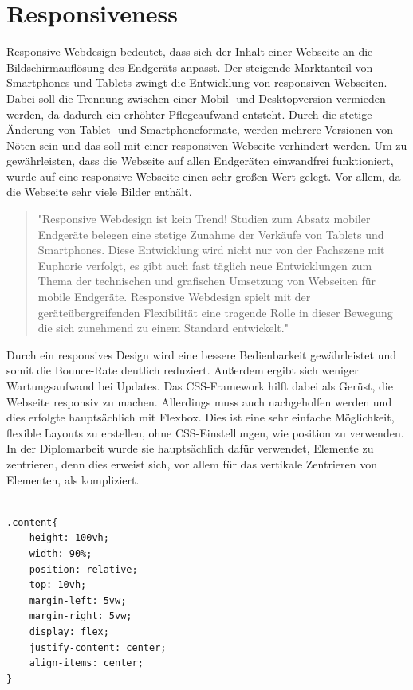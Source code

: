 \section{Responsiveness}
Responsive Webdesign bedeutet, dass sich der Inhalt einer Webseite an die Bildschirmauflösung des Endgeräts anpasst. Der steigende Marktanteil von Smartphones und Tablets zwingt die Entwicklung von responsiven Webseiten. Dabei soll die Trennung zwischen einer Mobil- und Desktopversion vermieden werden, da dadurch ein erhöhter Pflegeaufwand entsteht. Durch die stetige Änderung von Tablet- und Smartphoneformate, werden mehrere Versionen von Nöten sein und das soll mit einer responsiven Webseite verhindert werden.
Um zu gewährleisten, dass die Webseite auf allen Endgeräten einwandfrei funktioniert, wurde auf eine responsive Webseite einen sehr großen Wert gelegt. Vor allem, da die Webseite sehr viele Bilder enthält.
\begin{quote}
"Responsive Webdesign ist kein Trend! Studien zum Absatz mobiler Endgeräte belegen eine stetige Zunahme der Verkäufe von Tablets und Smartphones. Diese Entwicklung wird nicht nur von der Fachszene mit Euphorie verfolgt, es gibt auch fast täglich neue Entwicklungen zum Thema der technischen und grafischen Umsetzung von Webseiten für mobile Endgeräte. Responsive Webdesign spielt mit der geräteübergreifenden Flexibilität eine tragende Rolle in dieser Bewegung die sich zunehmend zu einem Standard entwickelt." \cite{responsive}
\end{quote}
Durch ein responsives Design wird eine bessere Bedienbarkeit gewährleistet und somit die Bounce-Rate deutlich reduziert. Außerdem ergibt sich weniger Wartungsaufwand bei Updates.  Das CSS-Framework hilft dabei als Gerüst, die Webseite responsiv zu machen. Allerdings muss auch nachgeholfen werden und dies erfolgte hauptsächlich mit Flexbox. Dies ist eine sehr einfache Möglichkeit, flexible Layouts zu erstellen, ohne CSS-Einstellungen, wie position zu verwenden. In der Diplomarbeit wurde sie hauptsächlich dafür verwendet, Elemente zu zentrieren, denn dies erweist sich, vor allem für das vertikale Zentrieren von Elementen, als kompliziert. \cite{responsive}
\lstset{
  frame=leftline,
  xleftmargin=.05\textwidth
}
\begin{lstlisting}

.content{
	height: 100vh;
	width: 90%;
	position: relative;
	top: 10vh;
	margin-left: 5vw;
	margin-right: 5vw;
	display: flex;
	justify-content: center;
	align-items: center;
}

\end{lstlisting} \leavevmode \newline
